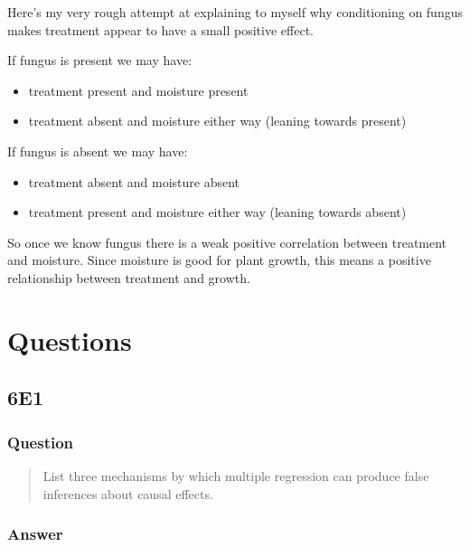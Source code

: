 \documentclass[
]{book}
\providecommand{\tightlist}{%
  \setlength{\itemsep}{0pt}\setlength{\parskip}{0pt}}
\begin{document}
Here's my very rough attempt at explaining to myself why conditioning on fungus makes treatment appear to have a small positive effect.

If fungus is present we may have:

\begin{itemize}
\tightlist
\item
  treatment present and moisture present
\item
  treatment absent and moisture either way (leaning towards present)
\end{itemize}

If fungus is absent we may have:

\begin{itemize}
\tightlist
\item
  treatment absent and moisture absent
\item
  treatment present and moisture either way (leaning towards absent)
\end{itemize}

So once we know fungus there is a weak positive correlation between treatment and moisture. Since moisture is good for plant growth, this means a positive relationship between treatment and growth.

\hypertarget{questions-5}{%
\section{Questions}\label{questions-5}}

\hypertarget{e1-4}{%
\subsection*{6E1}\label{e1-4}}

\hypertarget{question-49}{%
\subsubsection*{Question}\label{question-49}}

\begin{quote}
List three mechanisms by which multiple regression can produce false inferences about causal effects.
\end{quote}

\hypertarget{answer-49}{%
\subsubsection*{Answer}\label{answer-49}}
\end{document}
